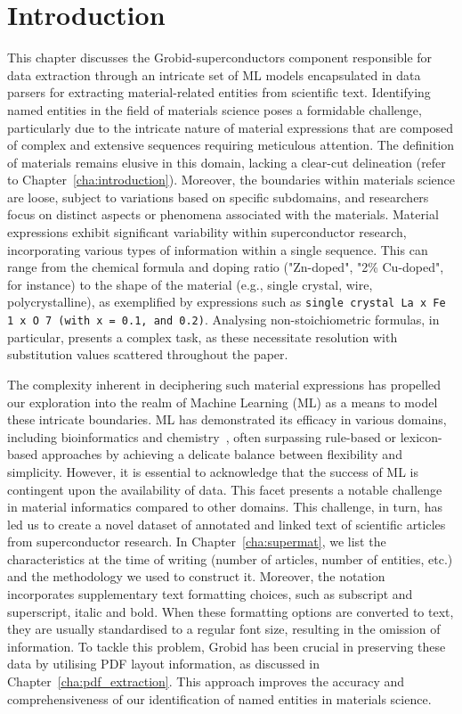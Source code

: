 \section{Introduction}
This chapter discusses the Grobid-superconductors component responsible for data extraction through an intricate set of ML models encapsulated in data parsers for extracting material-related entities from scientific text. 
Identifying named entities in the field of materials science poses a formidable challenge, particularly due to the intricate nature of material expressions that are composed of complex and extensive sequences requiring meticulous attention. 
The definition of materials remains elusive in this domain, lacking a clear-cut delineation (refer to Chapter~\ref{cha:introduction}). Moreover, the boundaries within materials science are loose, subject to variations based on specific subdomains, and researchers focus on distinct aspects or phenomena associated with the materials.
Material expressions exhibit significant variability within superconductor research, incorporating various types of information within a single sequence. This can range from the chemical formula and doping ratio ("Zn-doped", "2\% Cu-doped", for instance) to the shape of the material (e.g., single crystal, wire, polycrystalline), as exemplified by expressions such as \texttt{single crystal La x Fe 1 x O 7 (with x = 0.1, and 0.2)}. Analysing non-stoichiometric formulas, in particular, presents a complex task, as these necessitate resolution with substitution values scattered throughout the paper.

The complexity inherent in deciphering such material expressions has propelled our exploration into the realm of Machine Learning (ML) as a means to model these intricate boundaries. ML has demonstrated its efficacy in various domains, including bioinformatics and chemistry~\cite{jiang2011astudy,tang2013recognizing,isazawa2022single}, often surpassing rule-based or lexicon-based approaches by achieving a delicate balance between flexibility and simplicity. 
However, it is essential to acknowledge that the success of ML is contingent upon the availability of data. This facet presents a notable challenge in material informatics compared to other domains. This challenge, in turn, has led us to create a novel dataset of annotated and linked text of scientific articles from superconductor research. In Chapter~\ref{cha:supermat}, we list the characteristics at the time of writing (number of articles, number of entities, etc.) and the methodology we used to construct it. 
Moreover, the notation incorporates supplementary text formatting choices, such as subscript and superscript, italic and bold. 
When these formatting options are converted to text, they are usually standardised to a regular font size, resulting in the omission of information.
To tackle this problem, Grobid has been crucial in preserving these data by utilising PDF layout information, as discussed in Chapter~\ref{cha:pdf_extraction}. This approach improves the accuracy and comprehensiveness of our identification of named entities in materials science.

